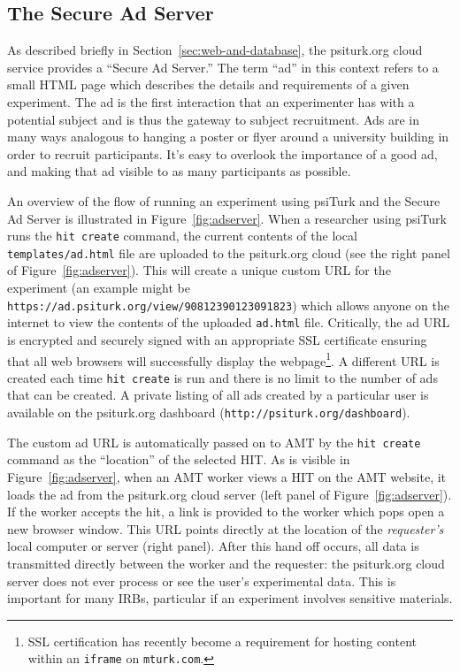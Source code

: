 \documentclass[twocolumn]{svjour3}          %
\newcommand{\psiturk}[0]{\textsf{psiTurk}}
\begin{document}
\subsection{The Secure Ad Server}
\label{sec:adserver}

As described briefly in Section~\ref{sec:web-and-database}, the psiturk.org
cloud service provides a ``Secure Ad Server.''  The term ``ad'' in this context
refers to a small HTML page which describes the details and requirements of a
given experiment.  The ad is the first interaction that an experimenter has
with a potential subject and is thus the gateway to subject recruitment. Ads
are in many ways analogous to hanging a poster or flyer around a university
building in order to recruit participants. It's easy to overlook the importance
of a good ad, and making that ad visible to as many participants as possible.

An overview of the flow of running an experiment using
\psiturk{} and the Secure Ad Server is illustrated in
Figure~\ref{fig:adserver}.  When a researcher using \psiturk{}
runs the \texttt{hit create} command, the current contents of the local
\texttt{templates/ad.html} file are uploaded to the psiturk.org cloud (see
the right panel of Figure~\ref{fig:adserver}).
This will create a unique custom URL for the experiment (an example might be
\texttt{https://ad.psiturk.org/view/90812390123091823}) which
allows anyone on the internet to view the contents of the uploaded \texttt{ad.html}
file.  Critically, the ad URL is encrypted and
securely signed with an appropriate SSL certificate ensuring that all
web browsers will successfully display the webpage\footnote{SSL certification has recently become a requirement for hosting content within an \texttt{iframe} on \texttt{mturk.com}.}. A different URL is created each time \texttt{hit create}
is run and there is no limit to the number of ads that can be created.  A private listing of all ads created by a particular user is available on the psiturk.org dashboard (\texttt{http://psiturk.org/dashboard}).

The custom ad URL is automatically passed
on to AMT by the \texttt{hit create} command as the ``location'' of
the selected HIT.  As is visible in Figure~\ref{fig:adserver},
when an AMT worker views a HIT on the AMT
website, it loads the ad from the psiturk.org cloud server (left panel of Figure~\ref{fig:adserver}).  If the worker accepts
the hit, a link is provided to the worker which pops open a new browser
window.  This URL points directly at the location of the \emph{requester's} local computer
or server (right panel).  After this hand off occurs, all data is transmitted directly between the worker
and the requester: the psiturk.org cloud server does not ever
process or see the user's experimental data.  This is important for many IRBs,
particular if an experiment involves sensitive materials.
\end{document}
